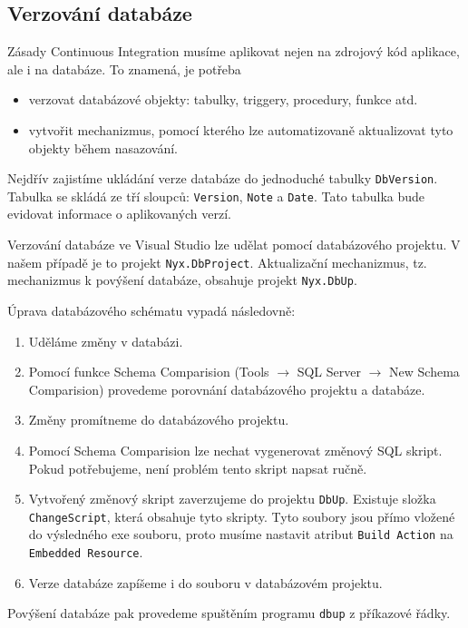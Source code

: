 \subsection{Verzování databáze}
Zásady Continuous Integration musíme aplikovat nejen na zdrojový kód aplikace, ale i na databáze. To znamená, je potřeba 

\begin{itemize}
\item verzovat databázové objekty: tabulky, triggery, procedury, funkce atd.
\item vytvořit mechanizmus, pomocí kterého lze automatizovaně aktualizovat tyto objekty během nasazování. 
\end{itemize}

Nejdřív zajistíme ukládání verze databáze do jednoduché tabulky \texttt{DbVersion}. Tabulka se skládá ze tří sloupců: \texttt{Version}, \texttt{Note} a \texttt{Date}. Tato tabulka bude evidovat informace o aplikovaných verzí.

Verzování databáze ve Visual Studio lze udělat pomocí databázového projektu. V našem případě je to projekt \texttt{Nyx.DbProject}. Aktualizační mechanizmus, tz. mechanizmus k povýšení databáze, obsahuje projekt \texttt{Nyx.DbUp}. 

Úprava databázového schématu vypadá následovně:

\begin{enumerate}
\item Uděláme změny v databázi.
\item Pomocí funkce Schema Comparision (Tools $\rightarrow$ SQL Server $\rightarrow$ New Schema Comparision) provedeme porovnání databázového projektu a databáze.
\item Změny promítneme do databázového projektu.
\item Pomocí Schema Comparision lze nechat vygenerovat změnový SQL skript. Pokud potřebujeme, není problém tento skript napsat ručně.
\item Vytvořený změnový skript zaverzujeme do projektu \texttt{DbUp}. Existuje složka \texttt{ChangeScript}, která obsahuje tyto skripty. Tyto soubory jsou přímo vložené do výsledného exe souboru, proto musíme nastavit atribut \texttt{Build Action} na \texttt{Embedded Resource}.
\item Verze databáze zapíšeme i do souboru v databázovém projektu.
\end{enumerate}

Povýšení databáze pak provedeme spuštěním programu \texttt{dbup} z příkazové řádky.

